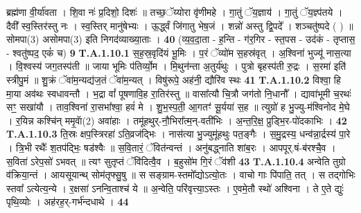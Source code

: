 \documentclass[17pt]{extarticle}
\begin{document}
                  ब्रह्म॑णा वी॒र्या॑वता । शि॒वा नः॑ प्र॒दिशो॒ दिशः॑ ॥ तच्छ॒ॅय्योरा वृ॑णीमहे । गा॒तुं ॅय॒ज्ञाय॑ । गा॒तुं ॅय॒ज्ञ्प॑तये । दैवी᳚ स्व॒स्तिर॑स्तु नः ।  स्व॒स्तिर् मानु॑षेभ्यः । ऊ॒र्द्ध्वं जि॑गातु भेष॒जं ।  शन्नो॑ अस्तु द्वि॒पदे᳚ । शञ्चतु॑ष्पदे ( ) ॥  सोमपा(3) असोमपा(3) इति निगद॑व्याख्या॒ताः । \textbf{ 40} \newline
                  \newline
                                                        (व्य॒व॒दा॒ता - ह॒न्ति - ग॑र॒गिर - स्त॒पस - उद॑कं - तृप्तास॒ - श्वतु॑ष्पद॒ एकं॑ च) \textbf{9} \newline \newline
                                \textbf{ T.A.1.10.1} \newline
                  स॒ह॒स्र॒वृदि॑यं भू॒मिः । प॒रं ॅव्यो॑म स॒हस्र॑वृत् । अ॒श्विना॑ भुज्यू॑ नास॒त्या । वि॒श्वस्य॑ जग॒तस्प॑ती ॥ जाया भूमिः प॑तिर्व्यो॒म । मि॒थुन॑न्ता अ॒तुर्य॑थुः । पुत्रो बृहस्प॑ती रु॒द्रः । स॒रमा॑ इति॑ स्त्रीपु॒मं ॥ शु॒क्रं ॅवा॑म॒न्यद्य॑ज॒तं ॅवा॑म॒न्यत् । विषु॑रूपे॒ अह॑नी॒ द्यौरि॑व स्थः \textbf{ 41} \newline
                  \newline
                                                                  \textbf{ T.A.1.10.2} \newline
                  विश्वा॒ हि मा॒या अव॑थः स्वधावन्तौ । भ॒द्रा वां᳚ पूषणावि॒ह रा॒तिर॑स्तु ॥ वासा᳚त्यौ चि॒त्रौ जग॑तो नि॒धानौ᳚ । द्यावा॑भूमी च॒रथः॑ सꣳ॒॒ सखा॑यौ ।  ताव॒श्विना॑ रा॒सभा᳚श्वा॒ हवं॑ मे । शु॒भ॒स्प॒ती॒ आ॒गतꣳ॑ सू॒र्यया॑ स॒ह ॥ त्युग्रो॑ ह भु॒ज्यु-म॑श्विनोद मे॒घे । र॒यिन्न कश्चि॑न् ममृ॒वाॅ(2) अवा॑हाः । तमू॑हथुर्-नौ॒भिरा᳚त्म॒न्-वती॑भिः ।  अ॒न्त॒रि॒क्ष॒ प्रुड्भि॒र-पो॑दकाभिः । \textbf{ 42} \newline
                  \newline
                                                                  \textbf{ T.A.1.10.3} \newline
                  ति॒स्रः क्षप॒स्त्रिरहा॑ ऽति॒व्रज॑द्भिः । नास॑त्या भु॒ज्युमू॑हथुः पत॒ङ्गैः । स॒मु॒द्रस्य॒ धन्व॑न्ना॒र्द्रस्य॑ पा॒रे । त्रि॒भी रथैः᳚ श॒तप॑द्भिः॒ षड॑श्वैः ॥ स॒वि॒तारं॒ ॅवित॑न्वन्तं । अनु॑बद्ध्नाति शांब॒रः । आपपूर्.षं-ब॑रश्चै॒व । स॒विता॑ ऽरेप॒सो॑ ऽभवत् ॥ त्यꣳ सुतृप्तं ॅवि॑दित्वै॒व । ब॒हुसो॑म गि॒रं ॅव॑शी \textbf{ 43} \newline
                  \newline
                                                                  \textbf{ T.A.1.10.4} \newline
                  अन्वेति तुग्रो व॑क्रिया॒न्तं । आयसूयान्थ् सोम॑तृफ्सु॒षु ॥  स सङ्ग्राम-स्तमो᳚द्योऽत्यो॒तः । वाचो गाः पि॑पाति॒ तत् ।  स तद्गोभिः स्तवा᳚ ऽत्येत्य॒न्ये । र॒क्षसा॑ ऽनन्वि॒ताश्च॑ ये ॥ अ॒न्वेति॒ परि॑वृत्त्या॒ऽस्तः । ए॒वमे॒तौ स्थो॑ अश्विना । ते ए॒ते द्युः॑ पृथि॒व्योः । अह॑रह॒र्-गर्भ॑न्दधाथे । \textbf{ 44} \newline
\end{document}
